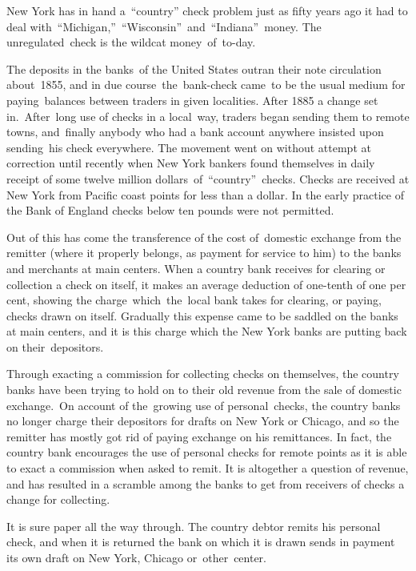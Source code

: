 \documentclass[twoside,symmetric,nobib,justified]{tufte-book}
\begin{document}
\newpage New York has in hand a~``country'' check problem just as fifty years ago
it had to deal with~``Michigan,''~``Wisconsin''~and~``Indiana''~money.
The unregulated~check is the wildcat money~of~to-day.~~

The deposits in the banks~of the United States outran their note
circulation about~1855, and in due course~the~bank-check came~to be the
usual medium for paying~balances between traders in given localities.
After 1885 a change set in.~After~long use of checks in a local~way,
traders began sending them to remote towns, and~finally anybody who had
a bank account anywhere insisted upon sending~his check everywhere. The
movement went on without attempt at correction until recently when New
York bankers found themselves in daily receipt of some twelve million
dollars~of~``country''~checks. Checks are received at New York from
Pacific coast points for less than a dollar. In the early practice of
the Bank of England checks below ten pounds were not permitted.

\enlargethispage{\baselineskip}

Out of this has come the transference of the cost of~domestic exchange
from the remitter (where it properly belongs, as payment for service to
him) to the banks and merchants at main centers. When a country bank
receives for clearing or collection a check on itself, it makes an
average deduction of one-tenth of one per cent, showing the
charge~which~the~local bank takes for clearing, or paying, checks drawn
on itself. Gradually this expense came to be saddled on the banks at
main centers, and it is this charge which the New York banks are putting
back on their~depositors.~

Through exacting a commission for collecting checks on themselves, the
country banks have been trying to hold on to their old revenue from the
sale of domestic exchange.~On account of the~growing use of
personal~checks, the country banks no longer charge their depositors for
drafts on New York or Chicago, and so the remitter has mostly got rid of
paying exchange on his remittances. In fact, the country bank encourages
the use of personal checks for remote points as it is able to exact a
commission when asked to remit. It is altogether a question of revenue,
and has resulted in a scramble among the banks to get from receivers of
checks a change for collecting.~

It is sure paper all the way through. The country debtor remits his
personal check, and when it is returned the bank on which it is drawn
sends in payment its own draft on New York, Chicago or~other~center.~
\end{document}
